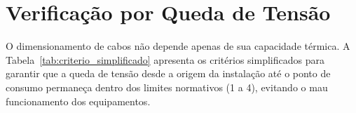 \documentclass[12pt,openright,oneside,a4paper,brazil]{abntex2}
\begin{document}

\section{Verificação por Queda de Tensão}

\hspace{1.27cm}O dimensionamento de cabos não depende apenas de sua capacidade térmica. A Tabela~\ref{tab:criterio_simplificado} apresenta os critérios simplificados para garantir que a queda de tensão desde a origem da instalação até o ponto de consumo permaneça dentro dos limites normativos (1 a 4), evitando o mau funcionamento dos equipamentos.

\begin{table}[H]
\centering
\small
\caption{Soma dos produtos potências (Watts) × distâncias (metros) para circuitos a 2 condutores em 110 V e 220 V}
\label{tab:criterio_simplificado}

\setlength{\tabcolsep}{8pt}       
\renewcommand{\arraystretch}{1.2} %
\vspace{0.15cm}
        

\end{table}
\end{document}
